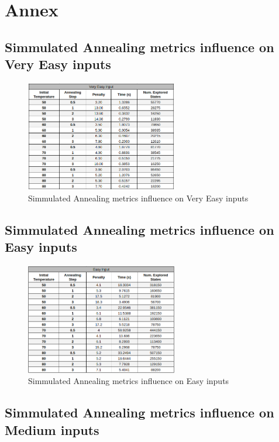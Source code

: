 \documentclass[conference]{IEEEtran}
\begin{document}
\section{Annex} \label{sec:annex}

\subsection{Simmulated Annealing metrics influence on Very Easy inputs}

\begin{figure}[H]
    \centerline{\includegraphics[width=250px]{annealing_very_easy.png}}
    \caption{Simmulated Annealing metrics influence on Very Easy inputs}
\end{figure}

\subsection{Simmulated Annealing metrics influence on Easy inputs}

\begin{figure}[H]
    \centerline{\includegraphics[width=250px]{annealing_easy.png}}
    \caption{Simmulated Annealing metrics influence on Easy inputs}
\end{figure}

\subsection{Simmulated Annealing metrics influence on Medium inputs}
\end{document}
